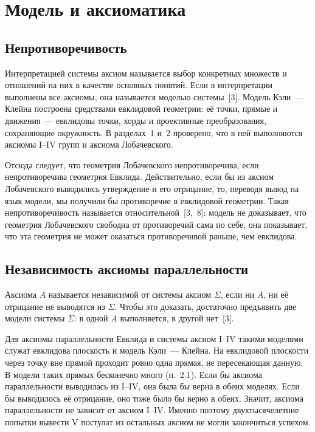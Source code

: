 \section{Модель и аксиоматика}

\subsection{Непротиворечивость}

Интерпретацией системы аксиом называется выбор конкретных множеств и отношений на них в качестве основных понятий. Если в интерпретации выполнены все аксиомы, она называется моделью системы~[3]. Модель Кэли~--- Клейна построена средствами евклидовой геометрии: её точки, прямые и движения~--- евклидовы точки, хорды и проективные преобразования, сохраняющие окружность. В разделах~1 и~2 проверено, что в ней выполняются аксиомы I--IV групп и аксиома Лобачевского.

Отсюда следует, что геометрия Лобачевского непротиворечива, если непротиворечива геометрия Евклида. Действительно, если бы из аксиом Лобачевского выводились утверждение и его отрицание, то, переводя вывод на язык модели, мы получили бы противоречие в евклидовой геометрии. Такая непротиворечивость называется относительной~[3,~8]: модель не доказывает, что геометрия Лобачевского свободна от противоречий сама по себе, она показывает, что эта геометрия не может оказаться противоречивой раньше, чем евклидова.

\subsection{Независимость аксиомы параллельности}

Аксиома $A$ называется независимой от системы аксиом $\Sigma$, если ни $A$, ни её отрицание не выводятся из $\Sigma$. Чтобы это доказать, достаточно предъявить две модели системы $\Sigma$: в одной $A$ выполняется, в другой нет~[3].

Для аксиомы параллельности Евклида и системы аксиом I--IV такими моделями служат евклидова плоскость и модель Кэли~--- Клейна. На евклидовой плоскости через точку вне прямой проходит ровно одна прямая, не пересекающая данную. В модели таких прямых бесконечно много (п.~2.1). Если бы аксиома параллельности выводилась из I--IV, она была бы верна в обеих моделях. Если бы выводилось её отрицание, оно тоже было бы верно в обеих. Значит, аксиома параллельности не зависит от аксиом I--IV. Именно поэтому двухтысячелетние попытки вывести V постулат из остальных аксиом не могли закончиться успехом.


